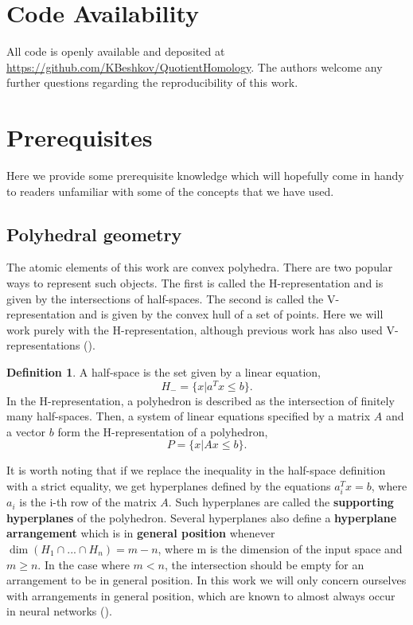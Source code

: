 \documentclass[10pt]{article} %
\theoremstyle{plain}
\theoremstyle{definition}
\newtheorem{definition}[theorem]{Definition}
\theoremstyle{remark}
\begin{document}
\section*{Code Availability}
All code is openly available and deposited at \url{https://github.com/KBeshkov/QuotientHomology}. The authors welcome any further questions regarding the reproducibility of this work.




\newpage
\appendix
\onecolumn
\section{Prerequisites}
\label{Prerequisites}

Here we provide some prerequisite knowledge which will hopefully come in handy to readers unfamiliar with some of the concepts that we have used.

\subsection{Polyhedral geometry}
The atomic elements of this work are convex polyhedra. There are two popular ways to represent such objects. The first is called the H-representation and is given by the intersections of half-spaces. The second is called the V-representation and is given by the convex hull of a set of points. Here we will work purely with the H-representation, although previous work has also used V-representations (\cite{masden2022algorithmic}).

\begin{definition}
    A half-space is the set given by a linear equation,
    \begin{equation*}
        H_- = \{x | a^Tx \leq b\}.
    \end{equation*}
    In the H-representation, a polyhedron is described as the intersection of finitely many half-spaces. Then, a system of linear equations specified by a matrix $A$ and a vector $b$ form the H-representation of a polyhedron,
    \begin{equation*}
        P = \{x | Ax \leq b\}.
    \end{equation*}
\end{definition}

It is worth noting that if we replace the inequality in the half-space definition with a strict equality, we get hyperplanes defined by the equations $a_i^Tx=b$, where $a_i$ is the i-th row of the matrix $A$. Such hyperplanes are called the \textbf{supporting hyperplanes} of the polyhedron. Several hyperplanes also define a \textbf{hyperplane arrangement} which is in \textbf{general position} whenever $\dim (H_1\cap ... \cap H_n) = m-n$, where m is the dimension of the input space and $m \geq n$. In the case where $m < n$, the intersection should be empty for an arrangement to be in general position. In this work we will only concern ourselves with arrangements in general position, which are known to almost always occur in neural networks (\cite{grigsby2022transversality}).
\end{document}

